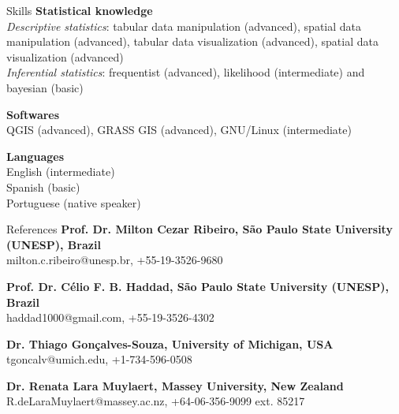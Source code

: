 \documentclass{resume}
\begin{document}
\begin{rSection}{Skills}
{\bf Statistical knowledge}
\\ {\it Descriptive statistics}: tabular data manipulation (advanced), spatial data manipulation (advanced), tabular data visualization (advanced), spatial data visualization (advanced)
\\ {\it Inferential statistics}: frequentist (advanced), likelihood (intermediate) and bayesian (basic)

{\bf Softwares}
\\ QGIS (advanced), GRASS GIS (advanced), GNU/Linux (intermediate)

{\bf Languages}
\\ English (intermediate)
\\ Spanish (basic)
\\ Portuguese (native speaker)

\end{rSection}


\begin{rSection}{References}
{\bf Prof. Dr. Milton Cezar Ribeiro, São Paulo State University (UNESP), Brazil} 
\\ milton.c.ribeiro@unesp.br, +55-19-3526-9680

{\bf Prof. Dr. Célio F. B. Haddad, São Paulo State University (UNESP), Brazil} 
\\ haddad1000@gmail.com, +55-19-3526-4302

{\bf Dr. Thiago Gonçalves-Souza, University of Michigan, USA} 
\\ tgoncalv@umich.edu, +1-734-596-0508

{\bf Dr. Renata Lara Muylaert, Massey University, New Zealand} 
\\ R.deLaraMuylaert@massey.ac.nz, +64-06-356-9099 ext. 85217

\end{rSection}
\end{document}
